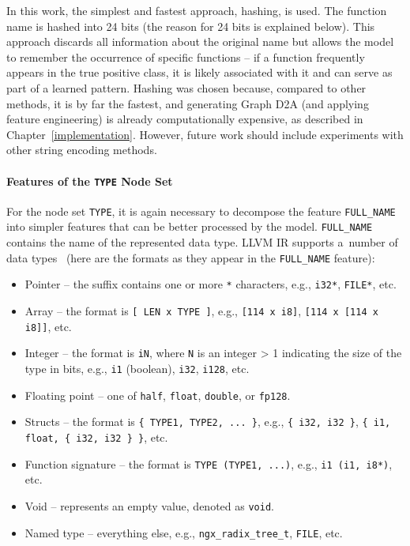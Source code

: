 In this work, the simplest and fastest approach, hashing, is used. The function name is hashed into 24 bits (the reason for 24 bits is explained below). This approach discards all information about the original name but allows the model to remember the occurrence of specific functions -- if a function frequently appears in the true positive class, it is likely associated with it and can serve as part of a learned pattern. Hashing was chosen because, compared to other methods, it is by far the fastest, and generating Graph D2A (and applying feature engineering) is already computationally expensive, as described in Chapter~\ref{implementation}. However, future work should include experiments with other string encoding methods.

\paragraph{Features of the \texttt{TYPE} Node Set}
For the node set \texttt{TYPE}, it is again necessary to decompose the feature \texttt{FULL\_NAME} into simpler features that can be better processed by the model. \texttt{FULL\_NAME} contains the name of the represented data type. LLVM IR supports a~number of data types~\cite{LLVM-IR} (here are the formats as they appear in the \texttt{FULL\_NAME} feature):
\begin{itemize}
    \item Pointer -- the suffix contains one or more \texttt{*} characters, e.g., \texttt{i32*}, \texttt{FILE*}, etc.
    \item Array -- the format is \texttt{[ LEN x TYPE ]}, e.g., \texttt{[114 x i8]}, \texttt{[114 x [114 x i8]]}, etc.
    \item Integer -- the format is \texttt{iN}, where \texttt{N} is an integer > 1 indicating the size of the type in bits, e.g., \texttt{i1} (boolean), \texttt{i32}, \texttt{i128}, etc.
    \item Floating point -- one of \texttt{half}, \texttt{float}, \texttt{double}, or \texttt{fp128}.
    \item Structs -- the format is \texttt{\{ TYPE1, TYPE2, ... \}}, e.g., \texttt{\{ i32, i32 \}}, \texttt{\{ i1, float, \{ i32, i32 \} \}}, etc.
    \item Function signature -- the format is \texttt{TYPE (TYPE1, ...)}, e.g., \texttt{i1 (i1, i8*)}, etc.
    \item Void -- represents an empty value, denoted as \texttt{void}.
    \item Named type -- everything else, e.g., \texttt{ngx\_radix\_tree\_t}, \texttt{FILE}, etc.
\end{itemize}

